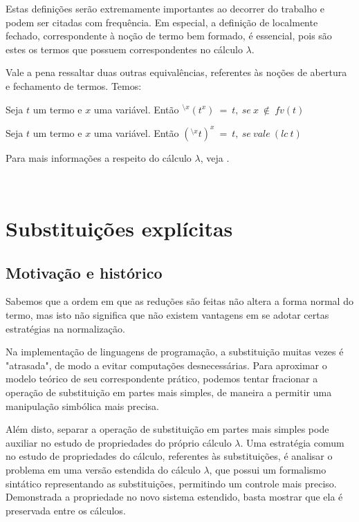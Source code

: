 Estas definições serão extremamente importantes ao decorrer do trabalho e podem
ser citadas com frequência. Em especial, a definição de localmente fechado,
correspondente à noção de termo bem formado, é essencial, pois são estes os
termos que possuem correspondentes no cálculo $\lambda$.

Vale a pena ressaltar duas outras equivalências, referentes às noções de
abertura e fechamento de termos. Temos:

\begin{lema}
    Seja $t$ um termo e $x$ uma variável. Então $^{\setminus x}(t^{x})\ =\ t,\ se\ x\
    \notin\ fv(t) $
\end{lema}
\begin{lema}
    Seja $t$ um termo e $x$ uma variável. Então $(^{\setminus x}t)^{x}\ =\ t,\ se\
    vale\ (lc\ t)$ 
\end{lema}

Para mais informações a respeito do cálculo $\lambda$, veja \cite{barendregt}.

\



\section{Substituições explícitas}

\subsection{Motivação e histórico}

Sabemos que a ordem em que as reduções são feitas não altera a forma normal do
termo, mas isto não significa que não existem vantagens em se adotar certas
estratégias na normalização. 

Na implementação de linguagens de programação, a substituição muitas vezes é
"atrasada", de modo a evitar computações desnecessárias. Para aproximar o modelo
teórico de seu correspondente prático, podemos tentar fracionar a operação de
substituição em partes mais simples, de maneira a permitir uma manipulação simbólica
mais precisa. \cite{levy1999}

Além disto, separar a operação de substituição em partes mais simples pode auxiliar
no estudo de propriedades do próprio cálculo $\lambda$. Uma estratégia comum
\cite{ben_cbv, ben_beta} no estudo de propriedades do cálculo, referentes às
substituições, é analisar o problema em uma versão estendida do cálculo
$\lambda$, que possui um formalismo sintático representando as substituições,
permitindo um controle mais preciso. Demonstrada a propriedade no novo
sistema estendido, basta mostrar que ela é preservada entre os cálculos.

